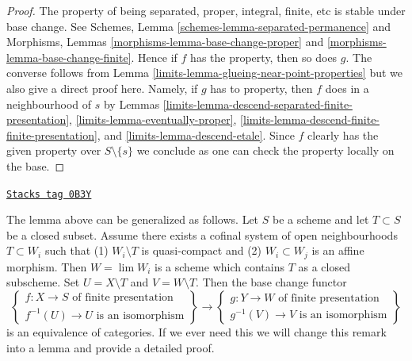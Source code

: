 \begin{proof}

The property of being separated, proper, integral, finite, etc
is stable under base change. See
Schemes, Lemma \ref{schemes-lemma-separated-permanence}
and
Morphisms, Lemmas \ref{morphisms-lemma-base-change-proper} and
\ref{morphisms-lemma-base-change-finite}.
Hence if $f$ has the property, then so does $g$.
The converse follows from Lemma \ref{limits-lemma-glueing-near-point-properties}
but we also give a direct proof here.
Namely, if $g$ has to property, then $f$ does in a neighbourhood of $s$ by
Lemmas \ref{limits-lemma-descend-separated-finite-presentation},
\ref{limits-lemma-eventually-proper},
\ref{limits-lemma-descend-finite-finite-presentation}, and
\ref{limits-lemma-descend-etale}.
Since $f$ clearly has the given property over $S \setminus \{s\}$
we conclude as one can check the property locally on the base.
\end{proof}

\begin{remark}
\label{limits-remark-more-general-modification}
\href{https://stacks.math.columbia.edu/tag/0B3Y}{\texttt{Stacks tag 0B3Y}}

The lemma above can be generalized as follows. Let $S$ be a scheme and
let $T \subset S$ be a closed subset. Assume there exists a cofinal
system of open neighbourhoods $T \subset W_i$ such that
(1) $W_i \setminus T$ is quasi-compact and
(2) $W_i \subset W_j$ is an affine morphism.
Then $W = \lim W_i$ is a scheme which contains $T$
as a closed subscheme. Set $U = X \setminus T$ and $V = W \setminus T$.
Then the base change functor
$$
\left\{
\begin{matrix}
f : X \to S\text{ of finite presentation} \\
f^{-1}(U) \to U\text{ is an isomorphism}
\end{matrix}
\right\}
\longrightarrow
\left\{
\begin{matrix}
g : Y \to W\text{ of finite presentation} \\
g^{-1}(V) \to V\text{ is an isomorphism}
\end{matrix}
\right\}
$$
is an equivalence of categories. If we ever need this we will
change this remark into a lemma and provide a detailed proof.
\end{remark}

